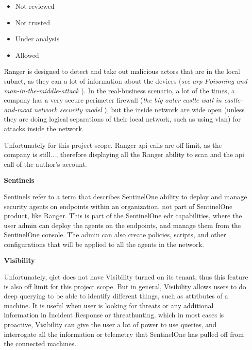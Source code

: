 \begin{multicols}{2}
      \begin{itemize}
            \item Not reviewed
            \item Not trusted
            \item Under analysis
            \item Allowed
      \end{itemize}

      Ranger is designed to detect and take out malicious actors that are in the local subnet, as they can a lot of information about the
      devices (\textit{see \acrshort{arp} Poisoning \cite{arpSpoofing} and man-in-the-middle-attack \cite{man-in-the-middleAttack}}).
      In the real-business scenario, a lot of the times, a company has a very secure perimeter firewall
      (\textit{the big outer castle wall in castle-and-moat network security model \cite{castleMoatWallNetwork}}), but the inside network
      are wide open (unless they are doing logical separations of their local network, such as using \acrshort{vlan}) for attacks inside
      the network.

      Unfortunately for this project scope, Ranger \acrshort{api} calls are off limit, as the company is still..., therefore displaying all
      the Ranger ability to scan and the \acrshort{api} call of the author's account.

      \textbf{Sentinels}

      Sentinels refer to a term that describes SentinelOne ability to deploy and manage security agents on endpoints within an
      organization, not part of SentinelOne product, like Ranger. This is part of the SentinelOne \acrshort{edr} capabilities,
      where the user admin can deploy the agents on the endpoints, and manage them from the SentinelOne console. The admin can
      also create policies, scripts, and other configurations that will be applied to all the agents in the network.

      \textbf{Visibility}

      Unfortunately, \acrshort{qict} does not have Visibility turned on its tenant, thus this feature is also off limit for this project
      scope. But in general, Visibility allows users to do deep querying to be able to identify different things, such as attributes of
      a machine. It is useful when user is looking for threats or any additional information in Incident Response or \gls{threathunting},
      which in most cases is proactive, Visibility can give the user a lot of power to use queries, and interrogate all the information
      or telemetry that SentinelOne has pulled off from the connected machines.


\end{multicols}
